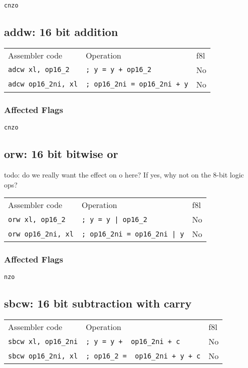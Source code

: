 \documentclass{book}
\begin{document}
\texttt{cnzo}


\subsection{addw: 16 bit addition}

\begin{tabular}{l l l}
Assembler code              & Operation                            & f8l \\
\texttt{adcw xl, op16\_2}   & \texttt{; y = y + op16\_2}           & No \\
\texttt{adcw op16\_2ni, xl} & \texttt{; op16\_2ni = op16\_2ni + y} & No
\end{tabular}

\subsubsection*{Affected Flags}

\texttt{cnzo}


\subsection{orw: 16 bit bitwise or}

todo: do we really want the effect on o here? If yes, why not on the 8-bit logic ops?

\begin{tabular}{l l l}
Assembler code             & Operation                            & f8l \\
\texttt{orw xl, op16\_2}   & \texttt{; y = y | op16\_2}           & No \\
\texttt{orw op16\_2ni, xl} & \texttt{; op16\_2ni = op16\_2ni | y} & No
\end{tabular}

\subsubsection*{Affected Flags}

\texttt{nzo}


\subsection{sbcw: 16 bit subtraction with carry}

\begin{tabular}{l l l}
Assembler code              & Operation                               & f8l \\
\texttt{sbcw xl, op16\_2ni} & \texttt{; y = y + ~op16\_2ni + c}       & No \\
\texttt{sbcw op16\_2ni, xl} & \texttt{; op16\_2 = ~op16\_2ni + y + c} & No
\end{tabular}
\end{document}
